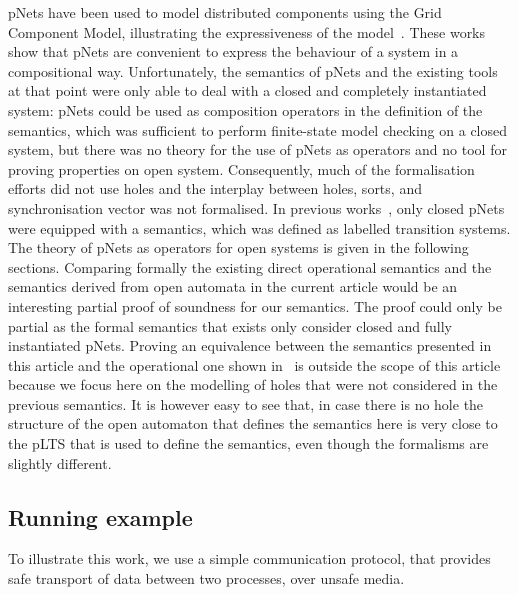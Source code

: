 \documentclass{elsarticle}
\begin{document}
pNets have been used to model distributed components using the Grid Component Model, illustrating the expressiveness of the model~\cite{AmeurBoulifa2017}. 
These works show that pNets are convenient to express the behaviour of a system in a compositional way. 
Unfortunately, the semantics of pNets and the existing tools at that point were only able to deal with a closed and completely instantiated system: pNets could be used as composition operators in the definition of the semantics, which was sufficient to perform finite-state model checking on a closed system, but there was no theory for the use of pNets as operators and no tool for proving properties on open system. 
Consequently, much of the formalisation efforts did not use holes and the interplay between holes, sorts, and synchronisation vector was not formalised.
In previous works~\cite{AmeurBoulifa2017}, only closed pNets were equipped with a semantics, which was defined as labelled transition systems. 
The theory of pNets as operators for open systems is given in the following sections. Comparing formally the existing direct operational semantics and the semantics derived from open automata in the current article would be an interesting partial proof of soundness for our semantics. The proof could only be partial as the formal semantics that exists only consider closed and fully instantiated pNets. Proving 
an equivalence between the semantics presented in this article and the operational one shown in~\cite{AmeurBoulifa2017} is outside the scope of this article because we focus here on the modelling of holes that were not considered in the previous semantics. 
It is however easy to see that, in case there is no hole the structure of the open automaton that defines the semantics here is very close to the pLTS that is used to define the semantics, even though the formalisms are slightly different.



\subsection{Running example}
To illustrate this work, we use a simple communication protocol, that provides safe transport of data between two processes, over unsafe media. 
\end{document}
